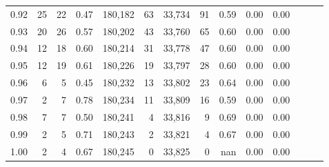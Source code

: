 \begin{tabular}{rrrrrrrrrrrrrr}
0.92 &     25 &     22 &  0.47 &  180,182 &       63 &  33,734 &      91 &  0.59 &  0.00 &      0.00 \\
0.93 &     20 &     26 &  0.57 &  180,202 &       43 &  33,760 &      65 &  0.60 &  0.00 &      0.00 \\
0.94 &     12 &     18 &  0.60 &  180,214 &       31 &  33,778 &      47 &  0.60 &  0.00 &      0.00 \\
0.95 &     12 &     19 &  0.61 &  180,226 &       19 &  33,797 &      28 &  0.60 &  0.00 &      0.00 \\
0.96 &      6 &      5 &  0.45 &  180,232 &       13 &  33,802 &      23 &  0.64 &  0.00 &      0.00 \\
0.97 &      2 &      7 &  0.78 &  180,234 &       11 &  33,809 &      16 &  0.59 &  0.00 &      0.00 \\
0.98 &      7 &      7 &  0.50 &  180,241 &        4 &  33,816 &       9 &  0.69 &  0.00 &      0.00 \\
0.99 &      2 &      5 &  0.71 &  180,243 &        2 &  33,821 &       4 &  0.67 &  0.00 &      0.00 \\
1.00 &      2 &      4 &  0.67 &  180,245 &        0 &  33,825 &       0 &   nan &  0.00 &      0.00 \\
\bottomrule
\end{tabular}
